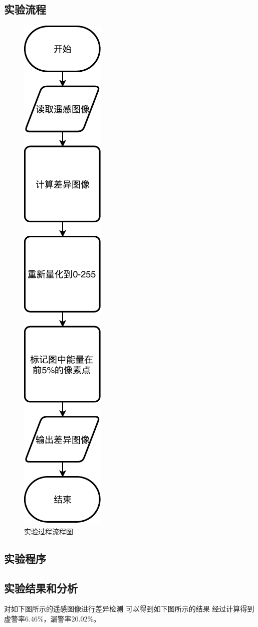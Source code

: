\subsection{实验流程}
\begin{figure}[H]
	\centering
	\includegraphics[width=0.15\linewidth]{figure/FinalFlowchart.pdf}
	\caption{实验过程流程图}
\end{figure}
\subsection{实验程序}






\subsection{实验结果和分析}
对如下图所示的遥感图像进行差异检测
可以得到如下图所示的结果
经过计算得到虚警率$6.46\%$，漏警率$20.02\%$。